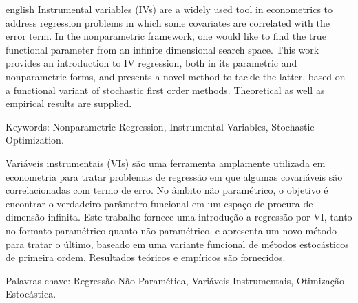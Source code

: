 \setlength{\absparsep}{18pt} 

\begin{resumo}[Abstract]
 \begin{otherlanguage*}{english}
     Instrumental variables (IVs) are a widely used tool in econometrics to address regression problems in which some covariates are correlated with the error term.
     In the nonparametric framework, one would like to find the true functional parameter from an infinite dimensional search space.
     This work provides an introduction to IV regression, both in its parametric and nonparametric forms, and presents a novel method to tackle the latter, based on a functional variant of stochastic first order methods.
     Theoretical as well as empirical results are supplied.
 \end{otherlanguage*}

 Keywords: Nonparametric Regression, Instrumental Variables, Stochastic Optimization.
\end{resumo}

\begin{resumo}[Resumo]
    Variáveis instrumentais (VIs) são uma ferramenta amplamente utilizada em econometria para tratar problemas de regressão em que algumas covariáveis são correlacionadas com termo de erro.
    No âmbito não paramétrico, o objetivo é encontrar o verdadeiro parâmetro funcional em um espaço de procura de dimensão infinita.
    Este trabalho fornece uma introdução a regressão por VI, tanto no formato paramétrico quanto não paramétrico, e apresenta um novo método para tratar o último, baseado em uma variante funcional de métodos estocásticos de primeira ordem.
    Resultados teóricos e empíricos são fornecidos.

    Palavras-chave: Regressão Não Paramética, Variáveis Instrumentais, Otimização Estocástica.
\end{resumo}
